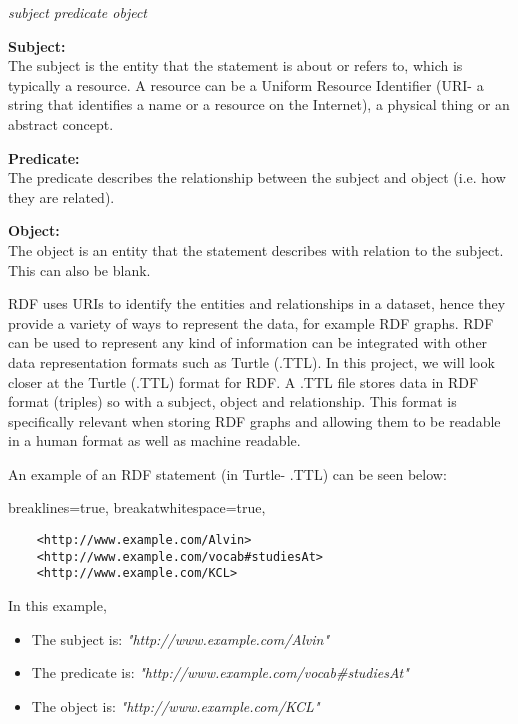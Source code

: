 \begin{center}
   \textit{subject predicate object}
\end{center} 

\textbf{Subject:} \\
The subject is the entity that the statement is about or refers to, which is typically a resource. A resource can be a Uniform Resource Identifier (URI- a string that identifies a name or a resource on the Internet), a physical thing or an abstract concept. 

\textbf{Predicate:} \\
The predicate describes the relationship between the subject and object (i.e. how they are related). 

\textbf{Object:} \\
The object is an entity that the statement describes with relation to the subject. This can also be blank. 

RDF uses URIs to identify the entities and relationships in a dataset, hence they provide a variety of ways to represent the data, for example RDF graphs. RDF can be used to represent any kind of information can be integrated with other data representation formats such as Turtle (.TTL). In this project, we will look closer at the Turtle (.TTL) format for RDF. A .TTL file stores data in RDF format (triples) so with a subject, object and relationship. This format is specifically relevant when storing RDF graphs and allowing them to be readable in a human format as well as machine readable. \cite{TTL}

\medskip
An example of an RDF statement (in Turtle- .TTL) can be seen below:

\lstset
{
    breaklines=true,
    breakatwhitespace=true,
}
\begin{center}
\begin{lstlisting}
    <http://www.example.com/Alvin> 
    <http://www.example.com/vocab#studiesAt> 
    <http://www.example.com/KCL>
\end{lstlisting}
\end{center} 

\noindent In this example, 
\begin{itemize}
\item The subject is: \textit{"http://www.example.com/Alvin"}
\item The predicate is: \textit{"http://www.example.com/vocab#studiesAt"}
\item The object is: \textit{"http://www.example.com/KCL"}
\end{itemize}

